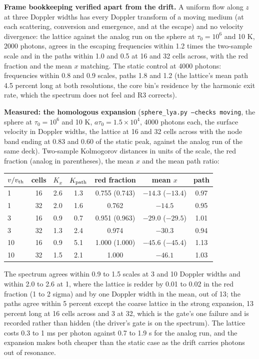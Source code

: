\documentclass[11pt]{article}
\begin{document}
\textbf{Frame bookkeeping verified apart from the drift.}  A uniform flow along $z$
at three Doppler widths has every Doppler transform of a moving medium (at each
scattering, conversion and emergence, and at the escape) and no velocity divergence:
the lattice against the analog run on the sphere at $\tau_0 = 10^6$ and 10 K, 2000
photons, agrees in the escaping frequencies within 1.2 times the two-sample scale and
in the paths within 1.0 and 0.5 at 16 and 32 cells across, with the red fraction and the
mean $x$ matching.  The static control at 4000 photons: frequencies within 0.8 and 0.9
scales, paths 1.8 and 1.2 (the lattice's mean path 4.5 percent long at both resolutions,
the core bin's residence by the harmonic exit rate, which the spectrum does not
feel and R3 corrects).

\textbf{Measured: the homologous expansion} (\texttt{sphere\_lya.py --checks moving},
the sphere at $\tau_0 = 10^6$ and 10 K, $a\tau_0 = 1.5\times10^4$, 4000 photons each,
the surface velocity in Doppler widths, the lattice at 16 and 32 cells across with the
node band ending at 0.83 and 0.60 of the static peak, against the analog run of the
same deck).  Two-sample Kolmogorov distances in units of the scale, the red fraction
(analog in parentheses), the mean $x$ and the mean path ratio:
\begin{center}
\begin{tabular}{lcccccc}
$v/v_{\rm th}$ & cells & $K_x$ & $K_{\rm path}$ & red fraction & mean $x$ & path \\
\hline
1 & 16 & 2.6 & 1.3 & 0.755 (0.743) & $-14.3$ ($-13.4$) & 0.97 \\
1 & 32 & 2.0 & 1.6 & 0.762 & $-14.5$ & 0.95 \\
3 & 16 & 0.9 & 0.7 & 0.951 (0.963) & $-29.0$ ($-29.5$) & 1.01 \\
3 & 32 & 1.3 & 2.4 & 0.974 & $-30.3$ & 0.94 \\
10 & 16 & 0.9 & 5.1 & 1.000 (1.000) & $-45.6$ ($-45.4$) & 1.13 \\
10 & 32 & 1.5 & 2.1 & 1.000 & $-46.1$ & 1.03 \\
\end{tabular}
\end{center}
The spectrum agrees within 0.9 to 1.5 scales at 3 and 10 Doppler widths and within 2.0
to 2.6 at 1, where the lattice is redder by 0.01 to 0.02 in the red fraction (1 to 2
sigma) and by one Doppler width in the mean, out of 13; the paths agree within 5 percent
except the coarse lattice in the strong expansion, 13 percent long at 16 cells across
and 3 at 32, which is the gate's one failure and is recorded rather than hidden (the
driver's gate is on the spectrum).  The lattice costs 0.3 to 1 ms per photon against
0.7 to 1.9 s for the analog run, and the expansion makes both cheaper than the static
case as the drift carries photons out of resonance.
\end{document}
